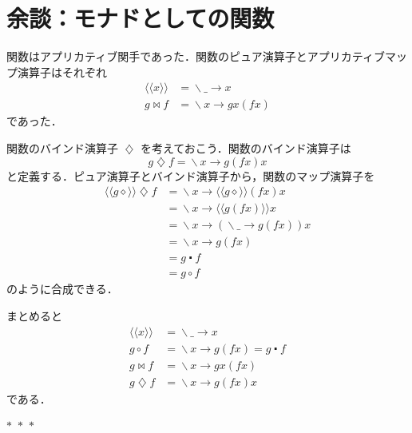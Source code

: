 \documentclass[a4paper,twocolumn]{jsbook}
\newcommand{\Langle}{\langle\!\langle}
\newcommand{\Rangle}{\rangle\!\rangle}
\newcommand{\separator}{\begin{center}$*$~$*$~$*$\end{center}}
\newcommand{\mAnyParam}{\_}
\newcommand{\mAnonParam}{\diamond}
\DeclareMathOperator{\mAppMapFunc}{\bowtie}
\DeclareMathOperator{\mBindFunc}{\diamondsuit}
\DeclareMathOperator{\mComp}{\centerdot}
\DeclareMathOperator{\mLambda}{\backslash}
\DeclareMathOperator{\mLambdaArrow}{\rightarrow}
\DeclareMathOperator{\mMapFunc}{\circ}
\newcommand{\mFuncWith}[1]{\Langle#1\Rangle}
\newcommand{\mLambdaExp}[2]{\mLambda{#1}\mLambdaArrow{#2}}
\begin{document}
\section{余談：モナドとしての関数}

関数はアプリカティブ関手であった．関数のピュア演算子とアプリカティブマップ演算子はそれぞれ
\begin{align}
\mFuncWith{x}&=\mLambdaExp{\mAnyParam}{x}\\
g\mAppMapFunc f&=\mLambdaExp{x}{gx(fx)}
\end{align}
であった．

関数のバインド演算子 $\mBindFunc$ を考えておこう．関数のバインド演算子は
\begin{equation}
g\mBindFunc f=\mLambdaExp{x}{g(fx)x}
\end{equation}
と定義する．ピュア演算子とバインド演算子から，関数のマップ演算子を
\begin{align}
\mFuncWith{g\mAnonParam}\mBindFunc f
&=\mLambdaExp{x}{\mFuncWith{g\mAnonParam}(fx)x}\\
&=\mLambdaExp{x}{\mFuncWith{g(fx)}x}\\
&=\mLambdaExp{x}{(\mLambdaExp{\mAnyParam}{g(fx)})x}\\
&=\mLambdaExp{x}{g(fx)}\\
&=g\mComp f\\
&=g\mMapFunc f
\end{align}
のように合成できる．

まとめると
\begin{align}
\mFuncWith{x}&=\mLambdaExp{\mAnyParam}{x}\\
g\mMapFunc f&=\mLambdaExp{x}{g(fx)}=g\mComp f\\
g\mAppMapFunc f&=\mLambdaExp{x}{gx(fx)}\\
g\mBindFunc f&=\mLambdaExp{x}{g(fx)x}
\end{align}
である．


\separator
\end{document}
